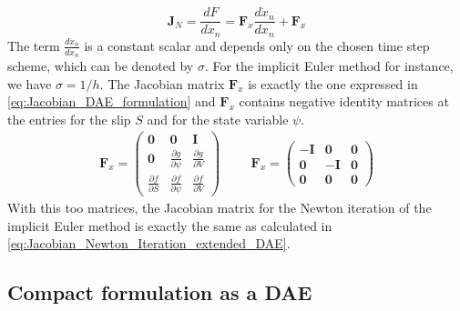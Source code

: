 \begin{equation}
\mathbf{J}_N = \frac{dF}{dx_n} = \mathbf{F}_{\dot{x}}\frac{d\dot{x}_n}{dx_n} + \mathbf{F}_x	
\end{equation}
The term $\frac{d\dot{x}_n}{dx_n}$ is a constant scalar and depends only on the chosen time step scheme, which can be denoted by $\sigma$. For the implicit Euler method for instance, we have $\sigma = 1/h$. The Jacobian matrix $\mathbf{F}_x$ is exactly the one expressed in \autoref{eq:Jacobian_DAE_formulation} and $\mathbf{F}_x$ contains negative identity matrices at the entries for the slip $S$ and for the state variable $\psi$.
\begin{align}
\mathbf{F}_x = \begin{pmatrix} 
\mathbf{0}                     &  \mathbf{0}                       & 
\mathbf{I}                    \\ 
\mathbf{0}                     &  \frac{\partial g}{\partial \psi} & 
\frac{\partial g}{\partial V} \\ 
\frac{\partial f}{\partial S}  &  \frac{\partial f}{\partial \psi} &  
\frac{\partial f}{\partial V} 
\end{pmatrix} &&&
\mathbf{F}_{\dot{x}} = \begin{pmatrix} 
-\mathbf{I}  &  \mathbf{0}  & \mathbf{0} \\ 
\mathbf{0}  & -\mathbf{I}  & \mathbf{0} \\ 
\mathbf{0}  &  \mathbf{0}  & \mathbf{0}
\end{pmatrix}
\end{align}
With this too matrices, the Jacobian matrix for the Newton iteration of the implicit Euler method is exactly the same as calculated in \autoref{eq:Jacobian_Newton_Iteration_extended_DAE}.



\subsection{Compact formulation as a DAE}
